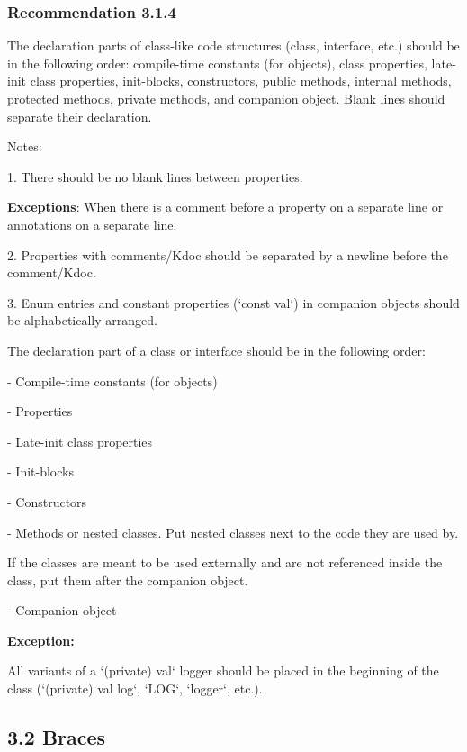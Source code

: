 \subsubsection*{\textbf{Recommendation 3.1.4}}
\leavevmode\newline

The declaration parts of class-like code structures (class, interface, etc.) should be in the following order: compile-time constants (for objects), class properties, late-init class properties, init-blocks, constructors, public methods, internal methods, protected methods, private methods, and companion object. Blank lines should separate their declaration.

Notes:

1.	There should be no blank lines between properties.

\textbf{Exceptions}: When there is a comment before a property on a separate line or annotations on a separate line.

2.	Properties with comments/Kdoc should be separated by a newline before the comment/Kdoc.

3.	Enum entries and constant properties (`const val`) in companion objects should be alphabetically arranged.



The declaration part of a class or interface should be in the following order:

- Compile-time constants (for objects)

- Properties

- Late-init class properties

- Init-blocks

- Constructors

- Methods or nested classes. Put nested classes next to the code they are used by.

If the classes are meant to be used externally and are not referenced inside the class, put them after the companion object.

- Companion object



\textbf{Exception:}

All variants of a `(private) val` logger should be placed in the beginning of the class (`(private) val log`, `LOG`, `logger`, etc.).



\subsection*{\textbf{3.2 Braces}}

